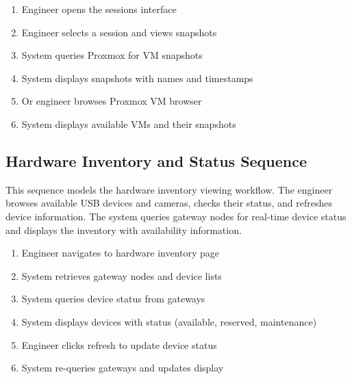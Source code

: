 \begin{enumerate}[topsep=0pt,itemsep=1pt,parsep=0pt,partopsep=0pt]
    \item Engineer opens the sessions interface
    \item Engineer selects a session and views snapshots
    \item System queries Proxmox for VM snapshots
    \item System displays snapshots with names and timestamps
    \item Or engineer browses Proxmox VM browser
    \item System displays available VMs and their snapshots
\end{enumerate}


\subsection{Hardware Inventory and Status Sequence}
This sequence models the hardware inventory viewing workflow. The engineer
browses available USB devices and cameras, checks their status, and refreshes
device information. The system queries gateway nodes for real-time device
status and displays the inventory with availability information.

\begin{enumerate}[topsep=0pt,itemsep=1pt,parsep=0pt,partopsep=0pt]
    \item Engineer navigates to hardware inventory page
    \item System retrieves gateway nodes and device lists
    \item System queries device status from gateways
    \item System displays devices with status (available, reserved, maintenance)
    \item Engineer clicks refresh to update device status
    \item System re-queries gateways and updates display
\end{enumerate}


